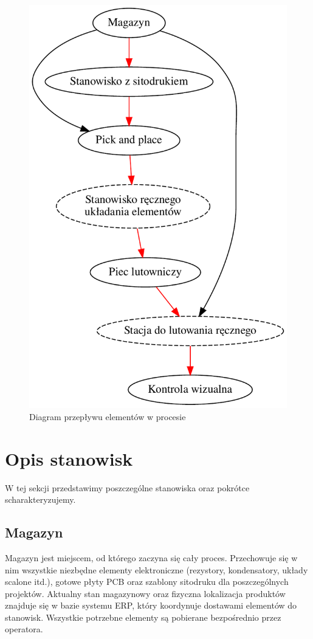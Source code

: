\begin{figure}[H]
	\centering
	\includegraphics[scale=0.5]{./chapters/chapter2/flow_work.pdf}
	\caption{Diagram przepływu elementów w procesie}
	\label{DiagFlow}
\end{figure}

\section{Opis stanowisk}
W tej sekcji przedstawimy poszczególne stanowiska oraz pokrótce scharakteryzujemy.

\subsection{Magazyn}
Magazyn jest miejscem, od którego zaczyna się cały proces.
Przechowuje się w nim wszystkie niezbędne elementy elektroniczne (rezystory, kondensatory, układy scalone itd.), gotowe płyty PCB oraz szablony sitodruku dla poszczególnych projektów.
Aktualny stan magazynowy oraz fizyczna lokalizacja produktów znajduje się w bazie systemu ERP, który koordynuje dostawami elementów do stanowisk.
Wszystkie potrzebne elementy są pobierane bezpośrednio przez operatora.

